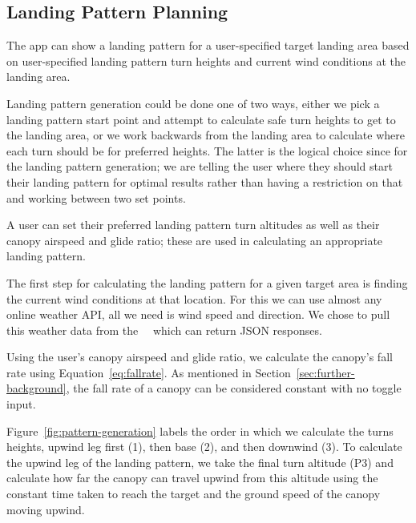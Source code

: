 \subsection{Landing Pattern Planning}\label{subsec:landing-pattern}
The app can show a landing pattern for a user-specified target landing area based on user-specified landing pattern turn heights and current wind conditions at the landing area.

Landing pattern generation could be done one of two ways, either we pick a landing pattern start point and attempt to calculate safe turn heights to get to the landing area, or we work backwards from the landing area to calculate where each turn should be for preferred heights. The latter is the logical choice since for the landing pattern generation; we are telling the user where they should start their landing pattern for optimal results rather than having a restriction on that and working between two set points.

A user can set their preferred landing pattern turn altitudes as well as their canopy airspeed and glide ratio; these are used in calculating an appropriate landing pattern.

The first step for calculating the landing pattern for a given target area is finding the current wind conditions at that location. For this we can use almost any online weather API, all we need is wind speed and direction. We chose to pull this weather data from the~~\cite{openweathermap_openweathermap_????} which can return JSON responses.

Using the user's canopy airspeed and glide ratio, we calculate the canopy's fall rate using Equation~\vref{eq:fallrate}. As mentioned in Section~\ref{sec:further-background}, the fall rate of a canopy can be considered constant with no toggle input.

Figure~\vref{fig:pattern-generation} labels the order in which we calculate the turns heights, upwind leg first (1), then base (2), and then downwind (3).
To calculate the upwind leg of the landing pattern, we take the final turn altitude (P3) and calculate how far the canopy can travel upwind from this altitude using the constant time taken to reach the target and the ground speed of the canopy moving upwind.

